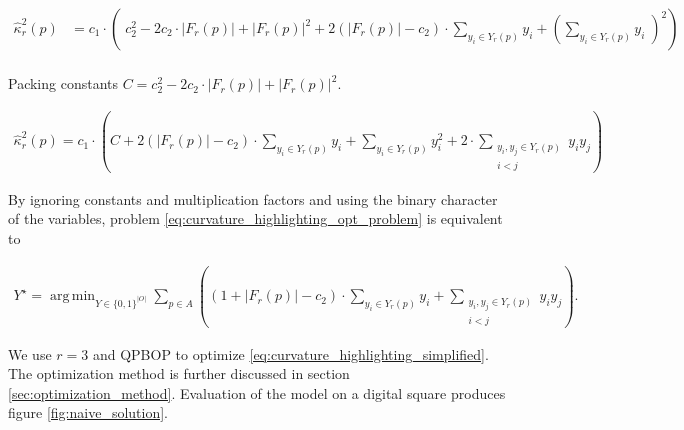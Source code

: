 \documentclass[runningheads]{llncs}
\DeclareMathOperator*{\argmin}{arg\,min}
\begin{document}
	\begin{align*}
		\hat{\kappa}_{r}^2(p) &= c_1 \cdot \left( \; c_2^2 - 2c_2 \cdot |F_r(p)| + |F_r(p)|^2 + 2\left( |F_r(p)| - c_2 \right) \cdot \sum_{y_i \in Y_r(p)}{y_i}  + \left( \sum_{y_i \in Y_r(p)}{y_i} \; \right) ^2 \right) \\[1em]
	\end{align*}
	
	Packing constants $C=c_2^2 - 2c_2 \cdot |F_r(p)| + |F_r(p)|^2$.
	
	\begin{align*}
		\hat{\kappa}_{r}^2(p) = c_1 \cdot \left( C + 2\left( |F_r(p)| - c_2 \right) \cdot \sum_{y_i \in Y_r(p)}{y_i} + \sum_{y_i \in Y_r(p)}{y_i^2} + 2 \cdot \sum_{ \substack{y_i,y_j \in Y_r(p) \\ i<j} }{y_iy_j}  \right)
	\end{align*}
	
	By ignoring constants and multiplication factors and using the binary character of the variables, problem \eqref{eq:curvature_highlighting_opt_problem} is equivalent to

	
\begin{align}			
	Y^{\star} = \argmin_{Y \in \{0,1\}^{|O|}} \sum_{p \in A}{ \left( { (1+ |F_r(p)|-c_2) \cdot \sum_{y_i \in Y_r(p)}{y_i} } + \sum_{ \substack{y_i,y_j \in Y_r(p) \\ i<j} }{y_iy_j} \right) }.
	\label{eq:curvature_highlighting_simplified}
\end{align}

We use $r=3$ and QPBOP to optimize \eqref{eq:curvature_highlighting_simplified}. The optimization method is further discussed in section \ref{sec:optimization_method}. Evaluation of the model on a digital square produces figure \ref{fig:naive_solution}.
\end{document}
